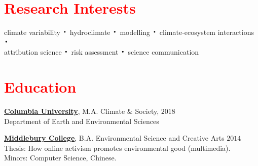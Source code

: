 \documentclass[margin, line]{res}
\newcommand*{\bigDot}{\raisebox{-0.25ex}{\scalebox{2.1}{$\cdot$}}}
\newcommand{\CU}{http://climatesociety.ei.columbia.edu/}
\newcommand{\Midd}{http://www.middlebury.edu/academics/es}
\begin{document}
 



\begin{resume}



\section{\sc \textcolor{Red}{\large{Research Interests}}}
climate variability $\bigDot$  hydroclimate $\bigDot$  modelling $\bigDot$  climate-ecosystem interactions $\bigDot$  \\attribution science $\bigDot$ risk assessment $\bigDot$ science communication  


\vspace{0.15in}
\section{\sc \textcolor{Red}{\large{Education}}}

{\bf \href{\CU}{Columbia University}}, M.A. Climate \& Society,   \hfill {$2018$}
\\
Department of Earth and Environmental Sciences
\\
    \vspace*{-.15in} 
  
{\bf \href{\Midd}{Middlebury College}}, B.A. Environmental Science and Creative Arts 
\hfill {$2014$}
\\
    Thesis:  How online activism promotes environmental good (multimedia).   \\ 
    Minors: Computer Science, Chinese. 
 


\end{resume}
\end{document}
